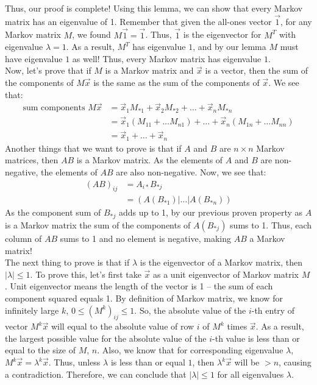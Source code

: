 \documentclass[12pt]{amsart}
\begin{document}
Thus, our proof is complete! Using this lemma, we can show that every Markov matrix has an eigenvalue of 1. Remember that given the all-ones vector $\vec{1}$, for any Markov matrix $M$, we found $M\vec{1} = \vec{1}$. Thus, $\vec{1}$ is the eigenvector for $M^T$ with eigenvalue $\lambda = 1$. As a result, $M^T$ has eigenvalue $1$, and by our lemma $M$ must have eigenvalue $1$ as well! Thus, every Markov matrix has eigenvalue $1$.\\
Now, let's prove that if $M$ is a Markov matrix and $\vec{x}$ is a vector, then the sum of the components of $M\vec{x}$ is the same as the sum of the components of $\vec{x}$. We see that:
\begin{align*}
	\text{sum components }M\vec{x} &= \vec{x}_1M_{*1} + \vec{x}_2M_{*2} + \dots + \vec{x}_nM_{*n}\\
			 &= \vec{x}_1(M_{11} + \dots M_{n1}) + \dots + \vec{x}_n(M_{1n} + \dots M_{nn})\\
			 &= \vec{x}_1 + \dots + \vec{x}_n 
\end{align*}
 Another things that we want to prove is that if $A$ and $B$ are $n \times n$ Markov matrices, then $AB$ is a Markov matrix. As the elements of $A$ and $B$ are non-negative, the elements of $AB$ are also non-negative. Now, we see that:
 \begin{align*}
 	(AB)_{ij} 	&= A_{i*}B_{*j}\\
 				&= (A(B_{*1})|\dots|A(B_{*n}))
 \end{align*}
As the component sum of $B_{*j}$ adds up to 1, by our previous proven property as $A$ is a Markov matrix the sum of the components of $A(B_{*j})$ sums to 1. Thus, each column of $AB$ sums to 1 and no element is negative, making $AB$ a Markov matrix!\\
The next thing to prove is that if $\lambda$ is the eigenvector of a Markov matrix, then $|\lambda|\leq1$. To prove this, let's first take $\vec{x}$ as a unit eigenvector of Markov matrix $M$. Unit eigenvector means the length of the vector is 1 -- the sum of each component squared equals 1. By definition of Markov matrix, we know for infinitely large $k$, $0 \leq (M^k)_{ij} \leq 1$. So, the absolute value of the $i$-th entry of vector $M^k\vec{x}$  will equal to the absolute value of row $i$ of $M^k$ times $\vec{x}$. As a result, the largest possible value for the absolute value of the $i$-th value is less than or equal to the size of $M$, $n$. Also, we know that for corresponding eigenvalue $\lambda$, $M^k\vec{x} = \lambda^k\vec{x}$. Thus, unless $\lambda$ is less than or equal $1$, then $\lambda^k\vec{x}$ will be $>n$, causing a contradiction. Therefore, we can conclude that $|\lambda| \leq 1$ for all eigenvalues $\lambda$.\\
\end{document}
